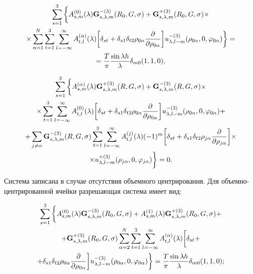 \begin{multline}
\sum\limits_{s = 1}^3 \bigg\{  A_{s,m}^{(0)}(\lambda ){\bf{G}}_{s,\lambda ,m}^{ - (3)}({R_0},G,\sigma ) + {\bf{G}}_{s,\lambda ,m}^{ + (3)}({R_0},G,\sigma ) \times \\
\times \sum\limits_{\alpha  = 1}^N {\sum\limits_{t = 1}^3 {\sum\limits_{l =  - \infty }^\infty  {A_{t,l}^{(\alpha )}} } } (\lambda )\bigg[{\delta _{st}} + {\delta _{s1}}{\delta _{t2}}{\rho _{0\alpha }}\frac{\partial }{{\partial {\rho _{0\alpha }}}}\bigg]u_{\lambda ,l - m}^{ - (3)}({\rho _{0\alpha }},0,{\varphi _{0\alpha }})\bigg\}  = \\
= \frac{T}{\pi }\frac{{\sin \lambda h}}{\lambda }{\delta _{m0}}(1,1,0),
\label{eq:7:20}
\end{multline}

\begin{multline}
\sum\limits_{s = 1}^3 \bigg\{  A_{s,m}^{(\alpha )}(\lambda ){\bf{G}}_{s,\lambda ,m}^{ + (3)}(R,G,\sigma ) + {\bf{G}}_{s,\lambda ,m}^{ - (3)}(R,G,\sigma ) \times \\
\times \sum\limits_{t = 1}^3 {\sum\limits_{l =  - \infty }^\infty  {A_{t,l}^{(0)}} } (\lambda )\bigg[{\delta _{st}} + {\delta _{s1}}{\delta _{t2}}{\rho _{0\alpha }}\frac{\partial }{{\partial {\rho _{0\alpha }}}}\bigg]u_{\lambda ,l - m}^{ - (3)}({\rho _{0\alpha }},0,{\varphi _{0\alpha }}) + \\
+ \sum\limits_{j \ne \alpha } {{\bf{G}}_{s,\lambda ,m}^{ - (3)}} (R,G,\sigma )\sum\limits_{t = 1}^3 {\sum\limits_{l =  - \infty }^\infty  {A_{t,l}^{(j)}} } (\lambda ){( - 1)^m}\bigg[{\delta _{st}} + {\delta _{s1}}{\delta _{t2}}{\rho _{j\alpha }}\frac{\partial }{{\partial {\rho _{j\alpha }}}}\bigg] \times \\
\times u_{\lambda ,l - m}^{ + (3)}({\rho _{j\alpha }},0,{\varphi _{j\alpha }})\bigg\}  = 0.
\label{eq:7:21}
\end{multline}

Система записана в случае отсутствия объемного центрирования. Для объем\-но-цент\-ри\-ро\-ван\-ной ячейки разрешающая система имеет вид:

\begin{multline}
\sum\limits_{s = 1}^3 \bigg\{  A_{s,m}^{(0)}(\lambda ){\bf{G}}_{s,\lambda ,m}^{ - (3)}({R_0},G,\sigma ) + A_{s,m}^{(1)}(\lambda ){\bf{G}}_{s,\lambda ,m}^{ + (3)}({R_0},G,\sigma ) + \\
+ {\bf{G}}_{s,\lambda ,m}^{ + (3)}({R_0},G,\sigma )\sum\limits_{\alpha  = 2}^N {\sum\limits_{t = 1}^3 {\sum\limits_{l =  - \infty }^\infty  {A_{t,l}^{(\alpha )}} } } (\lambda )\bigg[{\delta _{st}} + \\
+ {\delta _{s1}}{\delta _{t2}}{\rho _{0\alpha }}\frac{\partial }{{\partial {\rho _{0\alpha }}}}\bigg]u_{\lambda ,l - m}^{ - (3)}({\rho _{0\alpha }},0,{\varphi _{0\alpha }})\bigg\}  = \frac{T}{\pi }\frac{{\sin \lambda h}}{\lambda }{\delta _{m0}}(1,1,0);
\label{eq:7:22}
\end{multline}

